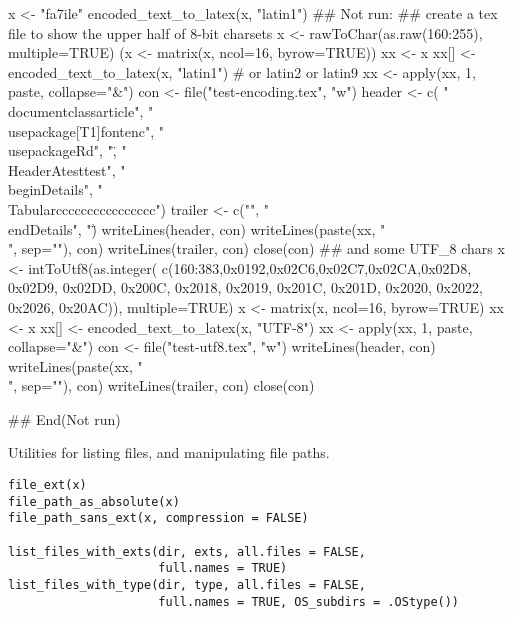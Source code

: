 \begin{Examples}
\begin{ExampleCode}
x <- "fa\xE7ile"
encoded_text_to_latex(x, "latin1")
## Not run: 
## create a tex file to show the upper half of 8-bit charsets
x <- rawToChar(as.raw(160:255), multiple=TRUE)
(x <- matrix(x, ncol=16, byrow=TRUE))
xx <- x
xx[] <- encoded_text_to_latex(x, "latin1") # or latin2 or latin9
xx <- apply(xx, 1, paste, collapse="&")
con <- file("test-encoding.tex", "w")
header <- c(
"\\documentclass{article}",
"\\usepackage[T1]{fontenc}",
"\\usepackage{Rd}",
"\",
"\\HeaderA{test}{}{test}",
"\\begin{Details}\relax",
"\\Tabular{cccccccccccccccc}{")
trailer <- c("}", "\\end{Details}", "\")
writeLines(header, con)
writeLines(paste(xx, "\\", sep=""), con)
writeLines(trailer, con)
close(con)
## and some UTF_8 chars
x <- intToUtf8(as.integer(
    c(160:383,0x0192,0x02C6,0x02C7,0x02CA,0x02D8,
      0x02D9, 0x02DD, 0x200C, 0x2018, 0x2019, 0x201C,
      0x201D, 0x2020, 0x2022, 0x2026, 0x20AC)),
               multiple=TRUE)
x <- matrix(x, ncol=16, byrow=TRUE)
xx <- x
xx[] <- encoded_text_to_latex(x, "UTF-8")
xx <- apply(xx, 1, paste, collapse="&")
con <- file("test-utf8.tex", "w")
writeLines(header, con)
writeLines(paste(xx, "\\", sep=""), con)
writeLines(trailer, con)
close(con)

## End(Not run)
\end{ExampleCode}
\end{Examples}
%
\begin{Description}\relax
Utilities for listing files, and manipulating file paths.
\end{Description}
%
\begin{Usage}
\begin{verbatim}
file_ext(x)
file_path_as_absolute(x)
file_path_sans_ext(x, compression = FALSE)

list_files_with_exts(dir, exts, all.files = FALSE,
                     full.names = TRUE)
list_files_with_type(dir, type, all.files = FALSE,
                     full.names = TRUE, OS_subdirs = .OStype())
\end{verbatim}
\end{Usage}
